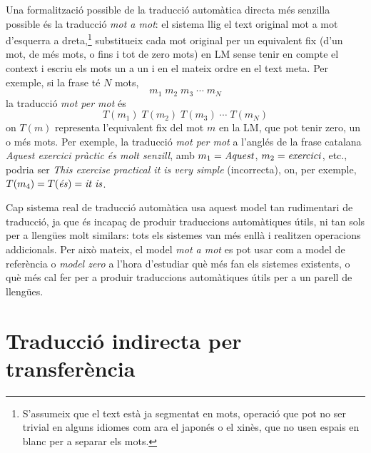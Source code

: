 \label{pg:mpm}
Una formalització possible de la traducció automàtica directa més
senzilla possible és la traducció \emph{mot a mot}: el sistema llig el
text original mot a mot d'esquerra a dreta,\footnote{S'assumeix que el
  text està ja segmentat en mots, operació que pot no ser trivial en
  alguns idiomes com ara el japonés o el xinès, que no usen espais en
  blanc per a separar els mots.} substitueix cada mot original per un
equivalent fix (d'un mot, de més mots, o fins i tot de zero mots) en
LM sense tenir en compte el context i escriu els mots un a un i en el
mateix ordre en el text meta.  Per exemple, si la frase té \(N\) mots,
\begin{displaymath}
  m_1\; m_2\; m_3\; \cdots \;m_N
\end{displaymath}
la traducció \emph{mot per mot} és
\begin{displaymath}
  T(m_1)\; T(m_2)\; T(m_3)\; \cdots\; T(m_N)
\end{displaymath}
on \(T(m)\) representa l'equivalent fix del mot \(m\) en la LM, que
pot tenir zero, un o més mots. Per exemple, la traducció \emph{mot per
  mot} a l'anglés de la frase catalana \emph{Aquest exercici pràctic
  és molt senzill}, amb \(m_1=\mbox{\emph{Aquest}}\),
\(m_2=\mbox{\emph{exercici}}\), etc., podria ser \emph{This exercise
  practical it is very simple} (incorrecta), on, per exemple,
\(T(m_4)=T(\mbox{\emph{és}})=\mbox{\emph{it is}}\).

Cap sistema real de traducció automàtica usa aquest model tan
rudimentari de traducció, ja que és incapaç de produir traduccions
automàtiques útils, ni tan sols per a llengües molt similars: tots els
sistemes van més enllà i realitzen operacions addicionals. Per això
mateix, el model \emph{mot a mot} es pot usar com a model de
referència o \emph{model zero} a l'hora d'estudiar què més fan els
sistemes existents, o què més cal fer per a produir traduccions
automàtiques útils per a un parell de llengües.

 
\section{Traducció indirecta per transferència}
\label{ss:classtrans}

